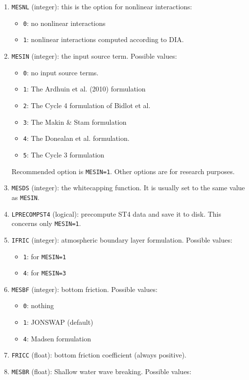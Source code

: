 \documentclass[12pt]{amsart}
\begin{document}
\begin{enumerate}
\item {\tt MESNL} (integer): this is the option for nonlinear interactions:
  \begin{itemize}
  \item {\tt 0}: no nonlinear interactions
  \item {\tt 1}: nonlinear interactions computed according to DIA.
  \end{itemize}
\item {\tt MESIN} (integer): the input source term. Possible values:
  \begin{itemize}
  \item {\tt 0}: no input source terms. 
  \item {\tt 1}: The Ardhuin et al. (2010) formulation
  \item {\tt 2}: The Cycle 4 formulation of Bidlot et al.
  \item {\tt 3}: The Makin \& Stam formulation
  \item {\tt 4}: The Donealan et al. formulation.
  \item {\tt 5}: The Cycle 3 formulation
  \end{itemize}
Recommended option is {\tt MESIN=1}. Other options are for research purposes.
\item {\tt MESDS} (integer): the whitecapping function. It is usually set to the same value as {\tt MESIN}.
\item {\tt LPRECOMPST4} (logical): precompute ST4 data and save it to disk. This concerns only {\tt MESIN=1}. 
\item {\tt IFRIC} (integer): atmospheric boundary layer formulation. Possible values:
  \begin{itemize}
  \item {\tt 1}: for {\tt MESIN=1}
  \item {\tt 4}: for {\tt MESIN=3}
  \end{itemize}
\item {\tt MESBF} (integer): bottom friction. Possible values:
  \begin{itemize}
  \item {\tt 0}: nothing
  \item {\tt 1}: JONSWAP (default)
  \item {\tt 4}: Madsen formulation
  \end{itemize}
\item {\tt FRICC} (float): bottom friction coefficient (always positive).
\item {\tt MESBR} (float): Shallow water wave breaking. Possible values:

\end{enumerate}
\end{document}
